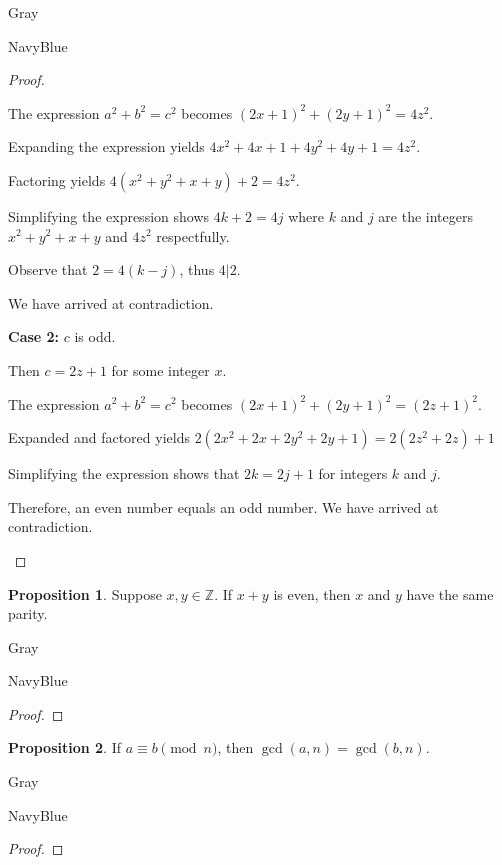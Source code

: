 \documentclass[12pt]{amsart}
\theoremstyle{named}
\newenvironment{prf}
{\medskip\begin{color}{Gray}\begin{framed}\begin{color}{NavyBlue}\begin{proof}[Proof]
\doublespacing}
{\end{proof}\end{color}\end{framed}\end{color}\medskip}
\theoremstyle{definition}
\newtheorem{proposition}{Proposition}
\newcommand{\Z}{\mathbb Z}
\begin{document}
\begin{prf}
\begin{adjustwidth}{2em}{0em}
		The expression $a^2 + b^2 = c^2$ becomes $(2x + 1)^2 + (2y+1)^2 = 4z^2$.

		Expanding the expression yields $4x^2 + 4x + 1 + 4y^2 + 4y + 1 = 4z^2$.

		Factoring yields $4(x^2+y^2+x+y)+2 = 4z^2$.

		Simplifying the expression shows $4k + 2 = 4j$ where $k$ and $j$ are
		the integers $x^2+y^2+x+y$ and $4z^2$ respectfully. 

		Observe that $2 = 4(k - j)$, thus $4|2$.
		
		We have arrived at contradiction.
	\end{adjustwidth}

	\textbf{Case 2:} $c$ is odd.
	\begin{adjustwidth}{2em}{0em}
		Then $c = 2z + 1$ for some integer $x$.

		The expression $a^2 + b^2 = c^2$ becomes $(2x + 1)^2 + (2y+1)^2 = (2z+1)^2$.

		Expanded and factored yields $2(2x^2 + 2x + 2y^2 + 2y + 1) = 2(2z^2 + 2z) + 1$

		Simplifying the expression shows that $2k = 2j + 1$ for integers $k$ and $j$.

		Therefore, an even number equals an odd number. We have arrived at contradiction.
	\end{adjustwidth}
\end{prf}

\phantom{ }

\phantom{ }

\phantom{ }

\phantom{ }
\begin{proposition}
	Suppose $x,y\in\Z$.
	If $x+y$ is even, then $x$ and $y$ have the same parity.
\end{proposition}

\begin{prf}
	
\end{prf}

\begin{proposition}
	If $a\equiv b\pmod n$, then $\gcd(a,n) = \gcd(b,n)$.
\end{proposition}

\begin{prf}
		
\end{prf}
\end{document}
